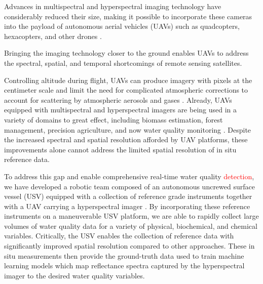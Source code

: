 \documentclass[remotesensing,article,submit,pdftex,moreauthors]{Definitions/mdpi}
\begin{document}
Advances in multispectral and hyperspectral imaging technology have considerably reduced their size, making it possible to incorporate these cameras into the payload of autonomous aerial vehicles (UAVs) such as quadcopters, hexacopters, and other drones \cite{hruska2012radiometric}.

Bringing the imaging technology closer to the ground enables UAVs to address the spectral, spatial, and temporal shortcomings of remote sensing satellites.

Controlling altitude during flight, UAVs can produce imagery with pixels at the centimeter scale and limit the need for complicated atmospheric corrections to account for scattering by atmospheric aerosols and gases \cite{adao2017hyperspectral,banerjee2020uav}. Already, UAVs equipped with multispectral and hyperspectral imagers are being used in a variety of domains to great effect, including biomass estimation, forest management, precision agriculture, and now water quality monitoring \cite{adao2017hyperspectral, padua2017uas,arroyo2019implementation,kurihara2020unmanned,ehmann2019monitoring, lu2021retrieval}. Despite the increased spectral and spatial resolution afforded by UAV platforms, these improvements alone cannot address the limited spatial resolution of in situ reference data.  



To address this gap and enable comprehensive real-time water quality \textcolor{red}{detection}, we have developed a robotic team composed of an autonomous uncrewed surface vessel (USV) equipped with a collection of reference grade instruments together with a UAV carrying a hyperspectral imager \cite{robotTeam1}. By incorporating these reference instruments on a maneuverable USV platform, we are able to rapidly collect large volumes of water quality data for a variety of physical, biochemical, and chemical variables. Critically, the USV enables the collection of reference data with significantly improved spatial resolution compared to other approaches. These in situ measurements then provide the ground-truth data used to train machine learning models which map reflectance spectra captured by the hyperspectral imager to the desired water quality variables.
\end{document}
